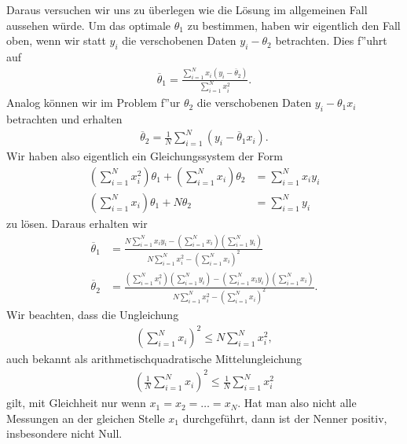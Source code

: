 \documentclass[letterpaper,10pt,english]{jupyterBook}
\begin{document}
Daraus versuchen wir uns zu überlegen wie die Lösung im allgemeinen Fall aussehen würde. Um das optimale \(\theta_1\) zu bestimmen, haben wir eigentlich den Fall oben, wenn wir statt \(y_i\) die verschobenen Daten \(y_i - \theta_2\) betrachten.
Dies f”uhrt auf
\begin{equation*}
\begin{split} \overline{\theta}_1 = \frac{\sum_{i=1}^N  x_i (y_i-\overline{\theta}_2)}{\sum_{i=1}^N  x_i^2}. \end{split}
\end{equation*}
Analog können wir im Problem f”ur \(\theta_2\) die verschobenen Daten \(y_i - \theta_1 x_i\) betrachten und erhalten
\begin{equation*}
\begin{split} \overline{\theta}_2 = \frac{1}N \sum_{i=1}^N   (y_i - \overline{\theta}_1 x_i). \end{split}
\end{equation*}
Wir haben also eigentlich ein Gleichungssystem der Form
\label{equation:vorkurs/regression:cecadb3a-3731-4682-ab77-516d581e0bb2}\begin{align}
(\sum_{i=1}^N x_i^2) \theta_1 + (\sum_{i=1}^N x_i) \theta_2 &= \sum_{i=1}^N x_i y_i \\
(\sum_{i=1}^N x_i) \theta_1 + N \theta_2 &= \sum_{i=1}^N y_i
\end{align}
zu lösen. Daraus erhalten wir
\label{equation:vorkurs/regression:4a1595a2-887c-40d5-a341-01f9c08dea66}\begin{align}
\overline{\theta}_1 &=  \frac{N \sum_{i=1}^N x_i y_i - (\sum_{i=1}^N x_i) (\sum_{i=1}^N y_i)}{N \sum_{i=1}^N x_i^2 - (\sum_{i=1}^N x_i)^2} \\
\overline{\theta}_2 &=  \frac{(\sum_{i=1}^N x_i^2) (\sum_{i=1}^N y_i) - (\sum_{i=1}^N x_i y_i) (\sum_{i=1}^N x_i)}{N \sum_{i=1}^N x_i^2 - (\sum_{i=1}^N x_i)^2}.
\end{align}
Wir beachten, dass die Ungleichung
\begin{equation*}
\begin{split} (\sum_{i=1}^N x_i)^2 \leq N \sum_{i=1}^N x_i^2, \end{split}
\end{equation*}
auch bekannt als arithmetisch\sphinxhyphen{}quadratische Mittelungleichung
\begin{equation*}
\begin{split} (\frac{1}N \sum_{i=1}^N x_i)^2 \leq \frac{1}N  \sum_{i=1}^N x_i^2\end{split}
\end{equation*}
gilt, mit Gleichheit nur wenn \(x_1=x_2=\ldots=x_N\). Hat man also nicht alle Messungen an der gleichen Stelle \(x_1\) durchgeführt, dann ist der Nenner positiv, insbesondere nicht Null.
\end{document}
